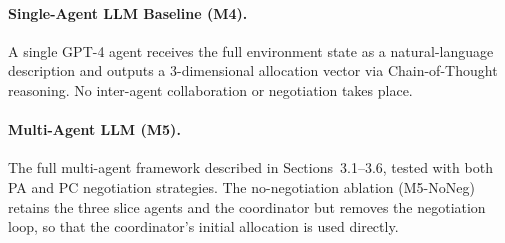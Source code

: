 \paragraph{Single-Agent LLM Baseline (M4).} A single GPT-4 agent receives the full environment state as a natural-language description and outputs a 3-dimensional allocation vector via Chain-of-Thought reasoning. No inter-agent collaboration or negotiation takes place.

\paragraph{Multi-Agent LLM (M5).} The full multi-agent framework described in Sections~3.1--3.6, tested with both PA and PC negotiation strategies. The no-negotiation ablation (M5-NoNeg) retains the three slice agents and the coordinator but removes the negotiation loop, so that the coordinator's initial allocation is used directly.

